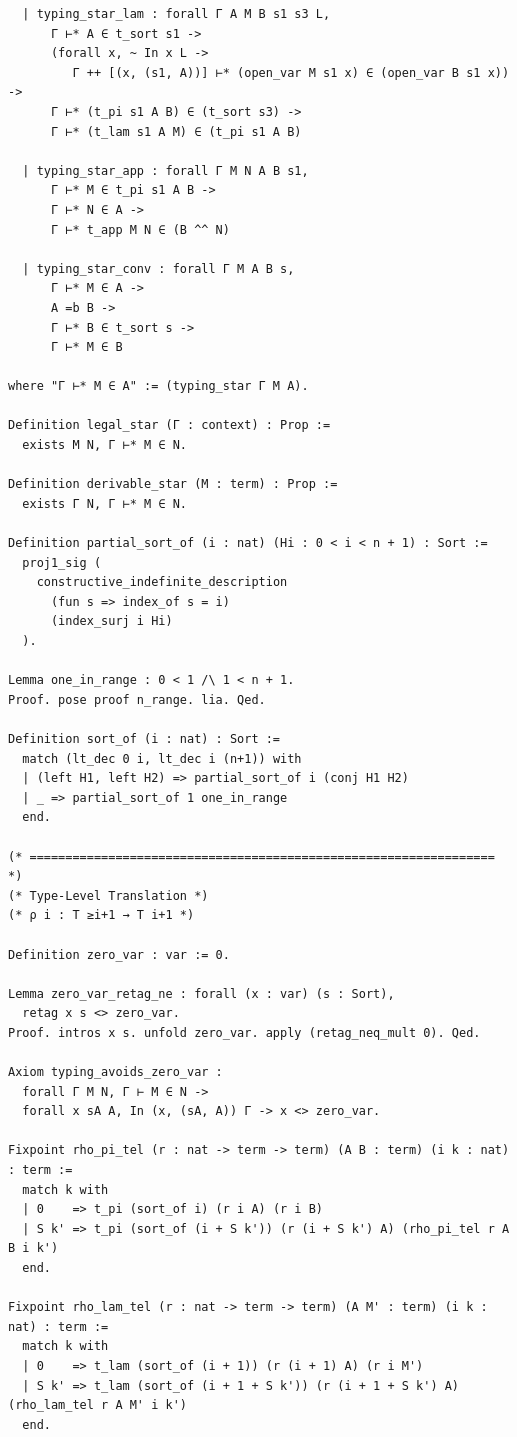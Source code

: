\begin{latin}
\begin{verbatim}
  | typing_star_lam : forall Γ A M B s1 s3 L,
      Γ ⊢* A ∈ t_sort s1 ->
      (forall x, ~ In x L ->
         Γ ++ [(x, (s1, A))] ⊢* (open_var M s1 x) ∈ (open_var B s1 x)) ->
      Γ ⊢* (t_pi s1 A B) ∈ (t_sort s3) ->
      Γ ⊢* (t_lam s1 A M) ∈ (t_pi s1 A B)

  | typing_star_app : forall Γ M N A B s1,
      Γ ⊢* M ∈ t_pi s1 A B ->
      Γ ⊢* N ∈ A ->
      Γ ⊢* t_app M N ∈ (B ^^ N)

  | typing_star_conv : forall Γ M A B s,
      Γ ⊢* M ∈ A ->
      A =b B ->
      Γ ⊢* B ∈ t_sort s ->
      Γ ⊢* M ∈ B

where "Γ ⊢* M ∈ A" := (typing_star Γ M A).

Definition legal_star (Γ : context) : Prop :=
  exists M N, Γ ⊢* M ∈ N.

Definition derivable_star (M : term) : Prop :=
  exists Γ N, Γ ⊢* M ∈ N.

Definition partial_sort_of (i : nat) (Hi : 0 < i < n + 1) : Sort :=
  proj1_sig (
    constructive_indefinite_description
      (fun s => index_of s = i)
      (index_surj i Hi)
  ).

Lemma one_in_range : 0 < 1 /\ 1 < n + 1.
Proof. pose proof n_range. lia. Qed.

Definition sort_of (i : nat) : Sort :=
  match (lt_dec 0 i, lt_dec i (n+1)) with
  | (left H1, left H2) => partial_sort_of i (conj H1 H2)
  | _ => partial_sort_of 1 one_in_range
  end.

(* ================================================================= *)
(* Type-Level Translation *)
(* ρ i : T ≥i+1 → T i+1 *)

Definition zero_var : var := 0.

Lemma zero_var_retag_ne : forall (x : var) (s : Sort),
  retag x s <> zero_var.
Proof. intros x s. unfold zero_var. apply (retag_neq_mult 0). Qed.

Axiom typing_avoids_zero_var :
  forall Γ M N, Γ ⊢ M ∈ N ->
  forall x sA A, In (x, (sA, A)) Γ -> x <> zero_var.

Fixpoint rho_pi_tel (r : nat -> term -> term) (A B : term) (i k : nat) : term :=
  match k with
  | 0    => t_pi (sort_of i) (r i A) (r i B)
  | S k' => t_pi (sort_of (i + S k')) (r (i + S k') A) (rho_pi_tel r A B i k')
  end.

Fixpoint rho_lam_tel (r : nat -> term -> term) (A M' : term) (i k : nat) : term :=
  match k with
  | 0    => t_lam (sort_of (i + 1)) (r (i + 1) A) (r i M')
  | S k' => t_lam (sort_of (i + 1 + S k')) (r (i + 1 + S k') A) (rho_lam_tel r A M' i k')
  end.


\end{verbatim}
\end{latin}
